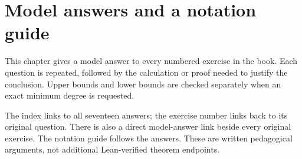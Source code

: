 \chapter{Model answers and a notation guide}\label{tx:ch:solutions}
This chapter gives a model answer to every numbered exercise in the book.
Each question is repeated, followed by the calculation or proof needed
to justify the conclusion. Upper bounds and lower bounds are checked
separately when an exact minimum degree is requested.

The index links to all seventeen answers; the exercise number links
back to its original question. There is also a direct model-answer
link beside every original exercise. The notation guide follows the
answers. These are written pedagogical arguments, not additional
Lean-verified theorem endpoints.

